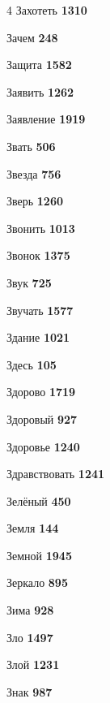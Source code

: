 \begin{multicols}{4}
\noindent Захотеть \dotfill \textbf{\color{secondary} 1310}\par
\noindent Зачем \dotfill \textbf{\color{secondary} 248}\par
\noindent Защита \dotfill \textbf{\color{secondary} 1582}\par
\noindent Заявить \dotfill \textbf{\color{secondary} 1262}\par
\noindent Заявление \dotfill \textbf{\color{secondary} 1919}\par
\noindent Звать \dotfill \textbf{\color{secondary} 506}\par
\noindent Звезда \dotfill \textbf{\color{secondary} 756}\par
\noindent Зверь \dotfill \textbf{\color{secondary} 1260}\par
\noindent Звонить \dotfill \textbf{\color{secondary} 1013}\par
\noindent Звонок \dotfill \textbf{\color{secondary} 1375}\par
\noindent Звук \dotfill \textbf{\color{secondary} 725}\par
\noindent Звучать \dotfill \textbf{\color{secondary} 1577}\par
\noindent Здание \dotfill \textbf{\color{secondary} 1021}\par
\noindent Здесь \dotfill \textbf{\color{secondary} 105}\par
\noindent Здорово \dotfill \textbf{\color{secondary} 1719}\par
\noindent Здоровый \dotfill \textbf{\color{secondary} 927}\par
\noindent Здоровье \dotfill \textbf{\color{secondary} 1240}\par
\noindent Здравствовать \dotfill \textbf{\color{secondary} 1241}\par
\noindent Зелёный \dotfill \textbf{\color{secondary} 450}\par
\noindent Земля \dotfill \textbf{\color{secondary} 144}\par
\noindent Земной \dotfill \textbf{\color{secondary} 1945}\par
\noindent Зеркало \dotfill \textbf{\color{secondary} 895}\par
\noindent Зима \dotfill \textbf{\color{secondary} 928}\par
\noindent Зло \dotfill \textbf{\color{secondary} 1497}\par
\noindent Злой \dotfill \textbf{\color{secondary} 1231}\par
\noindent Знак \dotfill \textbf{\color{secondary} 987}\par

\end{multicols}
